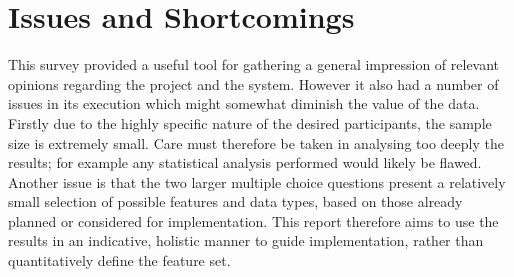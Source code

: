 \section{Issues and Shortcomings}
This survey provided a useful tool for gathering a general impression of relevant opinions regarding the project and the system. However it also had a number of issues in its execution which might somewhat diminish the value of the data. Firstly due to the highly specific nature of the desired participants, the sample size is extremely small. Care must therefore be taken in analysing too deeply the results; for example any statistical analysis performed would likely be flawed. Another issue is that the two larger multiple choice questions present a relatively small selection of possible features and data types, based on those already planned or considered for implementation.  This report therefore aims to use the results in an indicative, holistic manner to guide implementation, rather than quantitatively define the feature set.

